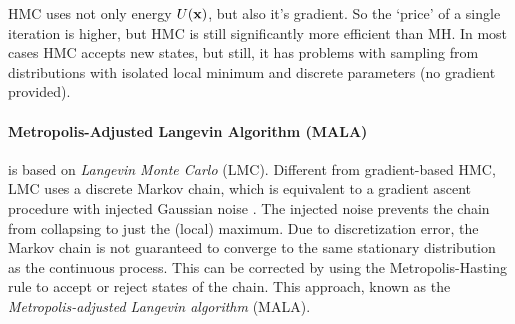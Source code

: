 HMC uses not only energy $U(\mathbf{x})$, but also it's gradient. So the `price' of a single iteration is higher, but HMC is still significantly more efficient than MH.
In most cases HMC accepts new states, but still, it has problems with sampling from distributions with isolated local minimum and discrete parameters (no gradient provided).

\paragraph{Metropolis-Adjusted Langevin Algorithm (MALA)} is based on \emph{Langevin Monte Carlo} (LMC). Different from gradient-based HMC, LMC uses a discrete Markov chain, which is equivalent to a gradient ascent procedure with injected Gaussian noise \cite{luan2020langevin}. The injected noise prevents the chain from collapsing to just the (local) maximum. Due to discretization error, the Markov chain is not guaranteed to converge to the same stationary distribution as the continuous process.
This can be corrected by using the Metropolis-Hasting rule to accept or reject states of the chain. This approach, known as the \emph{Metropolis-adjusted
Langevin algorithm} (MALA).

%


